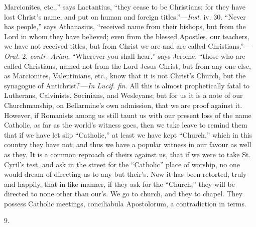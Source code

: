 Marcionites, etc.,'' says Lactantius, ``they cease to be Christians; for they have lost
Christ's name, and put on human and foreign titles.''—\emph{Inst}.
iv. 30. ``Never has people,'' says Athanasius, ``received name from
their bishops, but from the Lord in whom they have believed; even from
the blessed Apostles, our teachers, we have not received titles, but
from Christ we are and are called Christians.''—\emph{Orat}. 2. \emph{contr.
Arian}. ``Wherever you shall hear,'' says Jerome, ``those who
are called Christians, named not from the Lord Jesus Christ, but from
any one else, as Marcionites, Valentinians, etc., know that it is not
Christ's Church, but the synagogue of Antichrist.''—\emph{In Lucif.
fin}. All this is almost prophetically fatal to Lutherans,
Calvinists, Socinians, and Wesleyans; but for us it is a note of our
Churchmanship, on Bellarmine's own admission, that we are proof
against it. However, if Romanists among us still taunt us with our
present loss of the name Catholic, as far as the world's witness
goes, then we take leave to remind them that if we have let slip ``Catholic,'' at least we have kept
``Church,'' which in this
country they have not; and thus we have a popular witness in our
favour as well as they. It is a common reproach of theirs against us,
that if we were to take St. Cyril's test, and ask in the street for
the ``Catholic'' place of worship, no one would dream of
directing us to any but their's. Now it has been retorted, truly and
happily, that in like manner, if they ask for the ``Church,'' they
will be directed to none other than our's. We go to church, and they
to chapel. They possess Catholic meetings, conciliabula Apostolorum, a
contradiction in terms.

9.

